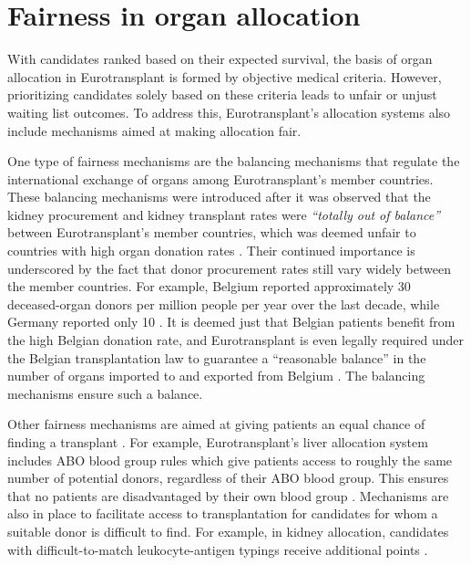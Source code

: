 \documentclass[11pt,twoside,]{book}
\begin{document}
\section{Fairness in organ allocation}\label{fairness-in-organ-allocation}

\vspace*{-1em}

With candidates ranked based on their expected survival, the basis of organ allocation
in Eurotransplant is formed by objective medical criteria. However, prioritizing
candidates solely based on these criteria leads to unfair or unjust
waiting list outcomes. To address this, Eurotransplant's
allocation systems also include mechanisms aimed at making allocation fair.

One type of fairness mechanisms are the balancing mechanisms that regulate the
international exchange of organs among Eurotransplant's member countries. These
balancing mechanisms were introduced after it was observed that the kidney procurement
and kidney transplant rates were \emph{``totally out of balance''} between Eurotransplant's
member countries, which was deemed unfair to countries with high organ donation rates
\citep{persijnEurotransplantKidneyAllocation2000}. Their continued importance
is underscored by the fact that donor procurement rates still
vary widely between the member countries. For example, Belgium reported
approximately 30 deceased-organ donors per million people per year over the last decade,
while Germany reported only 10 \citep{et_donor_pmp}.
It is deemed just that Belgian patients benefit from the high Belgian donation rate,
and Eurotransplant is even legally required under the Belgian transplantation law
to guarantee a ``reasonable balance'' in the number of organs imported to and exported
from Belgium \citep{BelgischeWet1986}. The balancing mechanisms ensure such a balance.

Other fairness mechanisms are aimed at giving patients an equal chance of
finding a transplant \citep{DeMeester1999}. For example, Eurotransplant's liver
allocation system includes ABO blood group rules which give patients access to
roughly the same number of potential donors, regardless of their ABO blood group. This ensures
that no patients are disadvantaged by their own blood group \citep{demeesterWhichABOmatchingRule2002}.
Mechanisms are also in place to facilitate access to transplantation for candidates
for whom a suitable donor is difficult to find. For example, in kidney allocation,
candidates with difficult-to-match leukocyte-antigen typings receive additional
points \citep{demeesterNewEurotransplantKidney1998}.
\end{document}
